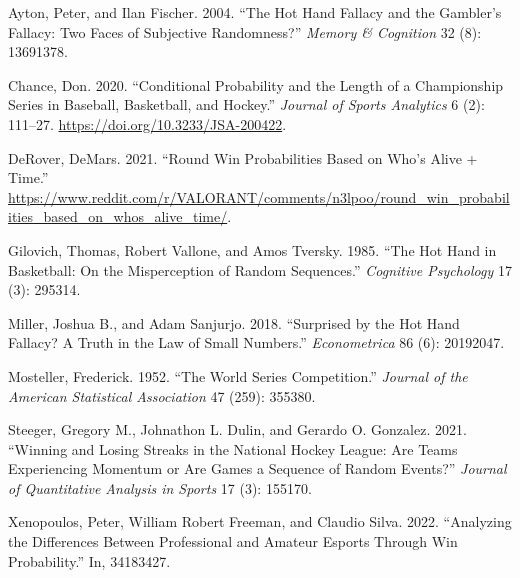 \documentclass{article}
\newlength{\cslhangindent}
\newlength{\cslentryspacingunit} %
\newenvironment{CSLReferences}[2] %
 {%
  \setlength{\parindent}{0pt}
  \ifodd #1
  \let\oldpar\par
  \def\par{\hangindent=\cslhangindent\oldpar}
  \fi
  \setlength{\parskip}{#2\cslentryspacingunit}
 }%
 {}
\begin{document}
\hypertarget{refs}{}
\begin{CSLReferences}{1}{0}
\leavevmode{}%
Ayton, Peter, and Ilan Fischer. 2004. {``The Hot Hand Fallacy and the
Gambler{'}s Fallacy: Two Faces of Subjective Randomness?''} \emph{Memory
\& Cognition} 32 (8): 13691378.

\leavevmode{}%
Chance, Don. 2020. {``Conditional Probability and the Length of a
Championship Series in Baseball, Basketball, and Hockey.''}
\emph{Journal of Sports Analytics} 6 (2): 111--27.
\url{https://doi.org/10.3233/JSA-200422}.

\leavevmode{}%
DeRover, DeMars. 2021. {``Round Win Probabilities Based on Who's Alive +
Time.''}
\url{https://www.reddit.com/r/VALORANT/comments/n3lpoo/round_win_probabilities_based_on_whos_alive_time/}.

\leavevmode{}%
Gilovich, Thomas, Robert Vallone, and Amos Tversky. 1985. {``The Hot
Hand in Basketball: On the Misperception of Random Sequences.''}
\emph{Cognitive Psychology} 17 (3): 295314.

\leavevmode{}%
Miller, Joshua B., and Adam Sanjurjo. 2018. {``Surprised by the Hot Hand
Fallacy? A Truth in the Law of Small Numbers.''} \emph{Econometrica} 86
(6): 20192047.

\leavevmode{}%
Mosteller, Frederick. 1952. {``The World Series Competition.''}
\emph{Journal of the American Statistical Association} 47 (259): 355380.

\leavevmode{}%
Steeger, Gregory M., Johnathon L. Dulin, and Gerardo O. Gonzalez. 2021.
{``Winning and Losing Streaks in the National Hockey League: Are Teams
Experiencing Momentum or Are Games a Sequence of Random Events?''}
\emph{Journal of Quantitative Analysis in Sports} 17 (3): 155170.

\leavevmode{}%
Xenopoulos, Peter, William Robert Freeman, and Claudio Silva. 2022.
{``Analyzing the Differences Between Professional and Amateur Esports
Through Win Probability.''} In, 34183427.

\end{CSLReferences}



\end{document}

